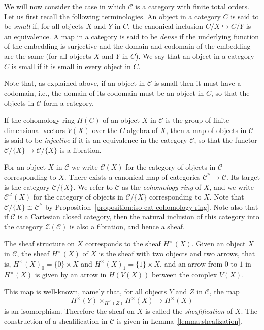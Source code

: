 \documentclass[a4paper,reqno,oneside]{article}
\begin{document}
We will now consider the case in which $\mathcal{C}$ is a category with finite total orders. Let us first recall the following terminologies. An object in a category $C$ is said to be \emph{small} if, for all objects $X$ and $Y$ in $C$, the canonical inclusion $C/X \hookrightarrow C/Y$ is an equivalence. A map in a category is said to be \emph{dense} if the underlying function of the embedding is surjective and the domain and codomain of the embedding are the same (for all objects $X$ and $Y$ in $C$). We say that an object in a category $C$ is small if it is small in every object in $C$. 

Note that, as explained above, if an object in $\mathcal{C}$ is small then it must have a codomain, i.e., the domain of its codomain must be an object in $C$, so that the objects in $\mathcal{C}$ form a category. 

If the cohomology ring $H(C)$ of an object $X$ in $\mathcal{C}$ is the group of finite dimensional vectors $V(X)$ over the $C$-algebra of $X$, then a map of objects in $\mathcal{C}$ is said to be \emph{injective} if it is an equivalence in the category $\mathcal{C}$, so that the functor $\mathcal{C}/\{X\} \rightarrow \mathcal{C}/\{X\}$ is a fibration. 

For an object $X$ in $\mathcal{C}$ we write $\mathcal{C}(X)$ for the category of objects in $\mathcal{C}$ corresponding to $X$. There exists a canonical map of categories $\mathcal{C}^{\mathbb{S}}\rightarrow \mathcal{C}$. Its target is the category $\mathcal{C}/\{X\}$. We refer to $\mathcal{C}$ as the \emph{cohomology ring} of $X$, and we write $\mathcal{C}^{\mathcal{Z}}(X)$ for the category of objects in $\mathcal{C}/\{X\}$ corresponding to $X$. Note that $\mathcal{C}/\{X\} \cong \mathcal{C}^{\mathbb{S}}$ by Proposition~\ref{proposition:iso-cat-cohomology-ring}. Note also that if $\mathcal{C}$ is a Cartesian closed category, then the natural inclusion of this category into the category $\mathcal{Z}(\mathcal{C})$ is also a fibration, and hence a sheaf. 

The sheaf structure on $X$ corresponds to the sheaf $H^{\times}(X)$. Given an object $X$ in $\mathcal{C}$, the sheaf $H^{\times}(X)$ of $X$ is the sheaf with two objects and two arrows, that is, $H^{\times}(X)_0 = \{0\}\times X$ and $H^{\times}(X)_1 = \{1\}\times X$, and an arrow from $0$ to $1$ in $H^{\times}(X)$ is given by an arrow in $H(V(X))$ between the complex $V(X)$. 

This map is well-known, namely that, for all objects $Y$ and $Z$ in $\mathcal{C}$, the map
\[
H^{\times}(Y) \times_{H^{\times}(Z)} H^{\times}(X) \rightarrow H^{\times}(X)
\]
is an isomorphism. Therefore the sheaf on $X$ is called the \emph{sheafification} of $X$. The construction of a sheafification in $\mathcal{C}$ is given in Lemma~\ref{lemma:sheafization}. 
\end{document}
